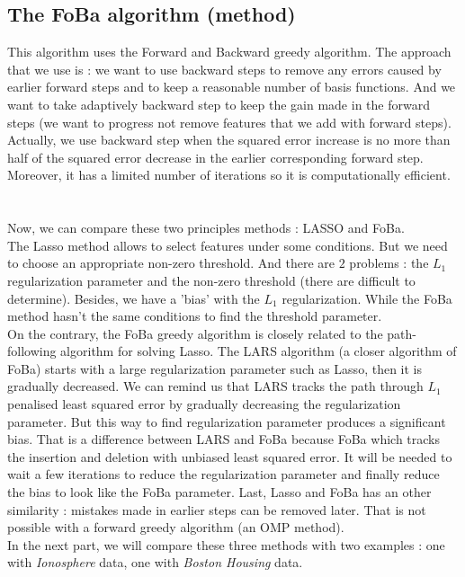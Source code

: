 \documentclass{article}
\begin{document}
\subsection{The FoBa algorithm (method)}
This algorithm uses the Forward and Backward greedy algorithm. The approach that we use is : we want to use backward steps to remove any errors caused by earlier forward steps and to keep a reasonable number of basis functions. And we want to take adaptively backward step to keep the gain made in the forward steps (we want to progress not remove features that we add with forward steps). Actually, we use backward step when the squared error increase is no more than half of the squared error decrease in the earlier corresponding forward step. Moreover, it has a limited number of iterations so it is computationally efficient. \\
\\
\\
Now, we can compare these two principles methods : LASSO and FoBa.\\
The Lasso method allows to select features under some conditions. But we need to choose an appropriate non-zero threshold. And there are $2$ problems : the $L_1$ regularization parameter and the non-zero threshold (there are difficult to determine). Besides, we have a 'bias' with the $L_1$ regularization. While the FoBa method hasn't the same conditions to find the threshold parameter.\\
On the contrary, the FoBa greedy algorithm is closely related to the path-following algorithm for solving Lasso. The LARS algorithm (a closer algorithm of FoBa) starts with a large regularization parameter such as Lasso, then it is gradually decreased. We can remind us that LARS tracks the path through $L_1$ penalised least squared error by gradually decreasing the regularization parameter. But this way to find regularization parameter produces a significant bias. That is a difference between LARS and FoBa because FoBa which tracks the insertion and deletion with unbiased least squared error. It will be needed to wait a few iterations to reduce the regularization parameter and finally reduce the bias to look like the FoBa parameter. Last, Lasso and FoBa has an other similarity : mistakes made in earlier steps can be removed later. That is not possible with a forward greedy algorithm (an OMP method).\\

In the next part, we will compare these three methods with two examples : one with \textit{Ionosphere} data, one with \textit{Boston Housing} data.
\end{document}
